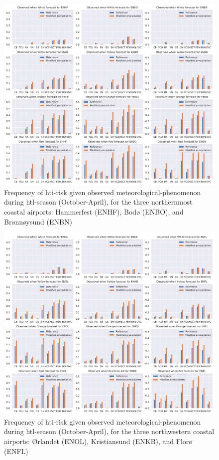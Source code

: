 \begin{figure}[H]
    \centering
    \includegraphics[width=\textwidth]{Figures/HTIMetar1.pdf}
    \caption{Frequency of \acrshort{hti}-risk given observed meteorological-phenomenon during \acrshort{htl}-season (October-April), for the three northernmost coastal airports: Hammerfest (ENHF), Bodø (ENBO), and Brønnøysund (ENBN)}
    \label{fig:HTIMETAR1}
\end{figure}

\begin{figure}[H]
    \centering
    \includegraphics[width=\textwidth]{Figures/HTIMetar2.pdf}
    \caption{Frequency of \acrshort{hti}-risk given observed meteorological-phenomenon during \acrshort{htl}-season (October-April), for the three northwestern coastal airports: Ørlandet (ENOL), Kristiansund (ENKB), and Florø (ENFL)}
    \label{fig:HTIMETAR2}
\end{figure}


